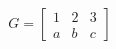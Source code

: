 \documentclass[preview]{standalone}
\begin{document}
\begin{align*}
G = \begin{bmatrix}
                        1 & 2 & 3\\
                        a & b & c
                    \end{bmatrix}
\end{align*}
\end{document}
